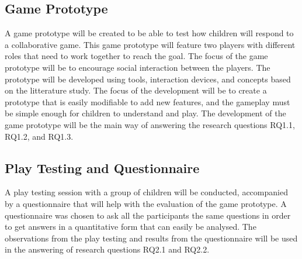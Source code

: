 \subsection{Game Prototype}
A game prototype will be created to be able to test how children will respond to a collaborative game. This game prototype will feature two players with different roles that need to work together to reach the goal. The focus of the game prototype will be to encourage social interaction between the players. The prototype will be developed using tools, interaction devices, and concepts based on the litterature study. The focus of the development will be to create a prototype that is easily modifiable to add new features, and the gameplay must be simple enough for children to understand and play. The development of the game prototype will be the main way of answering the research questions RQ1.1, RQ1.2, and RQ1.3.

\subsection{Play Testing and Questionnaire}
A play testing session with a group of children will be conducted, accompanied by a questionnaire that will help with the evaluation of the game prototype. A questionnaire was chosen to ask all the participants the same questions in order to get answers in a quantitative form that can easily be analysed. The observations from the play testing and results from the questionnaire will be used in the answering of research questions RQ2.1 and RQ2.2.




